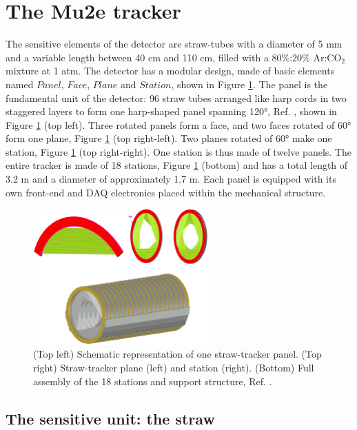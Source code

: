 \section{The Mu2e tracker}
The sensitive elements of the detector are straw-tubes with a diameter of 5 mm and a variable length between 40 cm and 110 cm, 
filled with a 80\%:20\% Ar:CO$_2$ mixture at 1 atm.  
The detector has a modular design, made of basic elements named $Panel$, $Face$, 
$Plane$ and $Station$, shown in Figure \ref{fig:trkpanel}. 
The panel is the fundamental unit of the detector: 96 straw tubes arranged like 
harp cords in two staggered layers to form one harp-shaped panel spanning 120°, Ref. \cite{bartoszek2015mu2e}, 
shown in Figure \ref{fig:trkpanel} (top left).
Three rotated panels form a face, and two faces rotated of 60° form one plane, Figure \ref{fig:trkpanel} (top right-left). 
Two planes rotated of 60° make one station, Figure \ref{fig:trkpanel} (top right-right).
One station is thus made of twelve panels. The entire tracker is made of 18 stations, Figure \ref{fig:trkpanel} (bottom) 
and has a total length of 3.2 m and a diameter of approximately 1.7 m.
Each panel is equipped with its own front-end and DAQ electronics placed within the mechanical structure.
\begin{figure}[!h]
\centering
\includegraphics[width =0.6\textwidth]{figures/png/Screenshot_20240306_222803.png}
\caption{(Top left) Schematic representation of one straw-tracker panel. (Top right) 
Straw-tracker plane (left) and station (right). (Bottom) Full assembly of the 18 
stations and support structure, Ref. \cite{bartoszek2015mu2e}.}
\label{fig:trkpanel}
\end{figure}
\subsection{The sensitive unit: the straw}

